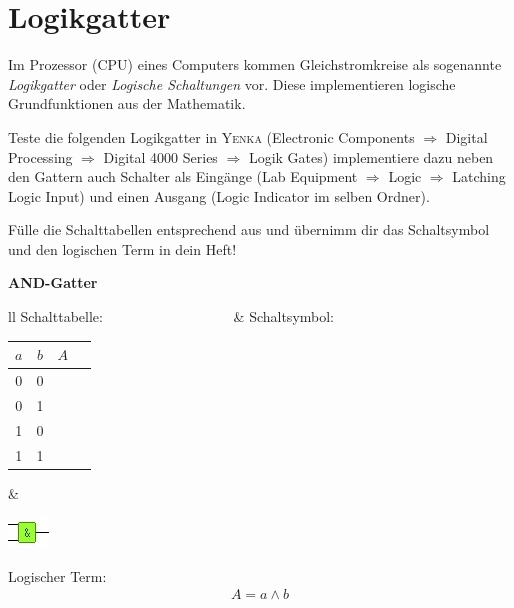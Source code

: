 \section{Logikgatter} \label{Sec:Logikgatter}

Im Prozessor (CPU) eines Computers kommen Gleichstromkreise als sogenannte \emph{Logikgatter} oder \emph{Logische Schaltungen} vor.
Diese implementieren logische Grundfunktionen aus der Mathematik.


\begin{Aufgabe}
Teste die folgenden Logikgatter in \textsc{Yenka} (Electronic Components $\Rightarrow$ Digital Processing $\Rightarrow$ Digital 4000 Series $\Rightarrow$ Logik Gates) implementiere dazu neben den Gattern auch Schalter als Eingänge (Lab Equipment $\Rightarrow$ Logic $\Rightarrow$ Latching Logic Input) und einen Ausgang (Logic Indicator im selben Ordner).

Fülle die Schalttabellen entsprechend aus und übernimm dir das Schaltsymbol und den logischen Term in dein Heft!

\vspace*{.7cm}

\textbf{AND-Gatter}

\begin{tabular}{ll}
Schalttabelle:~~~~~~~~~~~~~~~~~~ & Schaltsymbol: \\
\begin{tabular}{|c|c||c|}
\hline
$a$ & $b$ & $A$~~ \\ \hline \hline
0 & 0 &  \\ 
0 & 1 &  \\
1 & 0 &  \\
1 & 1 &  \\ \hline
\end{tabular}
&
\begin{minipage}{.6\textwidth}
\begin{center}
\includegraphics[scale=1.5]{pics/AND.jpg}
\end{center}

Logischer Term: \\
\begin{align*}
A = a \wedge b
\end{align*}
\end{minipage}

\end{tabular}





\end{Aufgabe}
